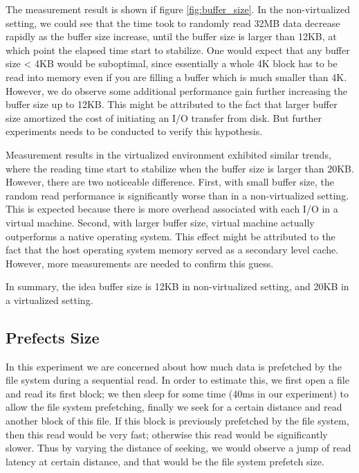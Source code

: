 The measurement result is shown if figure \ref{fig:buffer_size}. In the non-virtualized setting, we could see that the time took to randomly read 32MB data decrease rapidly as the buffer size increase, until the buffer size is larger than 12KB, at which point the elapsed time start to stabilize. One would expect that any buffer size < 4KB would be suboptimal, since essentially a whole 4K block has to be read into memory even if you are filling a buffer which is much smaller than 4K. However, we do observe some additional performance gain further increasing the buffer size up to 12KB. This might be attributed to the fact that larger buffer size amortized the cost of initiating an I/O transfer from disk. But further experiments needs to be conducted to verify this hypothesis. 

Measurement results in the virtualized environment exhibited similar trends, where the reading time start to stabilize when the buffer size is larger than 20KB. However, there are two noticeable difference. First, with small buffer size, the random read performance is significantly worse than in a non-virtualized setting. This is expected because there is more overhead associated with each I/O in a virtual machine. Second, with larger buffer size, virtual machine actually outperforms a native operating system. This effect might be attributed to the fact that the host operating system memory served as a secondary level cache. However, more measurements are needed to confirm this guess. 

In summary, the idea buffer size is 12KB in non-virtualized setting, and 20KB in a virtualized setting.

\subsection{Prefects Size}
In this experiment we are concerned about how much data is prefetched by the file system during a sequential read. In order to estimate this, we first open a file and read its first block; we then sleep for some time (40ms in our experiment) to allow the file system prefetching, finally we seek for a certain distance and read another block of this file. If this block is previously prefetched by the file system, then this read would be very fast; otherwise this read would be significantly slower. Thus by varying the distance of seeking, we would observe a jump of read latency at certain distance, and that would be the file system prefetch size. 

